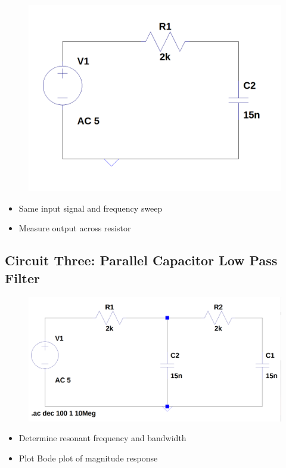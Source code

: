 \documentclass[12pt]{article}
\begin{document}
\begin{figure}[H]
	\includegraphics[width=\textwidth]{e6_02}
\end{figure}
\begin{itemize}
	\item Same input signal and frequency sweep
	\item Measure output across resistor
\end{itemize}

\subsection{Circuit Three: Parallel Capacitor Low Pass Filter}

\begin{figure}[H]
	\includegraphics[width=\textwidth]{e6_03}
\end{figure}
\begin{itemize}
	\item Determine resonant frequency and bandwidth
	\item Plot Bode plot of magnitude response
\end{itemize}
\end{document}
